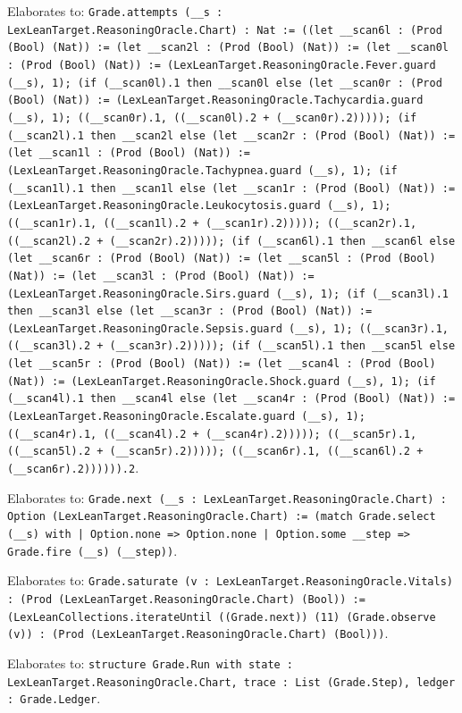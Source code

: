 \documentclass[11pt]{article}
\begin{document}
\noindent Elaborates to: \texttt{Grade.attempts (\_\_s : LexLeanTarget.ReasoningOracle.Chart) : Nat := ((let \_\_scan6l : (Prod (Bool) (Nat)) := (let \_\_scan2l : (Prod (Bool) (Nat)) := (let \_\_scan0l : (Prod (Bool) (Nat)) := (LexLeanTarget.ReasoningOracle.Fever.guard (\_\_s), 1); (if (\_\_scan0l).1 then \_\_scan0l else (let \_\_scan0r : (Prod (Bool) (Nat)) := (LexLeanTarget.ReasoningOracle.Tachycardia.guard (\_\_s), 1); ((\_\_scan0r).1, ((\_\_scan0l).2 + (\_\_scan0r).2))))); (if (\_\_scan2l).1 then \_\_scan2l else (let \_\_scan2r : (Prod (Bool) (Nat)) := (let \_\_scan1l : (Prod (Bool) (Nat)) := (LexLeanTarget.ReasoningOracle.Tachypnea.guard (\_\_s), 1); (if (\_\_scan1l).1 then \_\_scan1l else (let \_\_scan1r : (Prod (Bool) (Nat)) := (LexLeanTarget.ReasoningOracle.Leukocytosis.guard (\_\_s), 1); ((\_\_scan1r).1, ((\_\_scan1l).2 + (\_\_scan1r).2))))); ((\_\_scan2r).1, ((\_\_scan2l).2 + (\_\_scan2r).2))))); (if (\_\_scan6l).1 then \_\_scan6l else (let \_\_scan6r : (Prod (Bool) (Nat)) := (let \_\_scan5l : (Prod (Bool) (Nat)) := (let \_\_scan3l : (Prod (Bool) (Nat)) := (LexLeanTarget.ReasoningOracle.Sirs.guard (\_\_s), 1); (if (\_\_scan3l).1 then \_\_scan3l else (let \_\_scan3r : (Prod (Bool) (Nat)) := (LexLeanTarget.ReasoningOracle.Sepsis.guard (\_\_s), 1); ((\_\_scan3r).1, ((\_\_scan3l).2 + (\_\_scan3r).2))))); (if (\_\_scan5l).1 then \_\_scan5l else (let \_\_scan5r : (Prod (Bool) (Nat)) := (let \_\_scan4l : (Prod (Bool) (Nat)) := (LexLeanTarget.ReasoningOracle.Shock.guard (\_\_s), 1); (if (\_\_scan4l).1 then \_\_scan4l else (let \_\_scan4r : (Prod (Bool) (Nat)) := (LexLeanTarget.ReasoningOracle.Escalate.guard (\_\_s), 1); ((\_\_scan4r).1, ((\_\_scan4l).2 + (\_\_scan4r).2))))); ((\_\_scan5r).1, ((\_\_scan5l).2 + (\_\_scan5r).2))))); ((\_\_scan6r).1, ((\_\_scan6l).2 + (\_\_scan6r).2)))))).2}.\par
\noindent Elaborates to: \texttt{Grade.next (\_\_s : LexLeanTarget.ReasoningOracle.Chart) : Option (LexLeanTarget.ReasoningOracle.Chart) := (match Grade.select (\_\_s) with | Option.none => Option.none | Option.some \_\_step => Grade.fire (\_\_s) (\_\_step))}.\par
\noindent Elaborates to: \texttt{Grade.saturate (v : LexLeanTarget.ReasoningOracle.Vitals) : (Prod (LexLeanTarget.ReasoningOracle.Chart) (Bool)) := (LexLeanCollections.iterateUntil ((Grade.next)) (11) (Grade.observe (v)) : (Prod (LexLeanTarget.ReasoningOracle.Chart) (Bool)))}.\par
\noindent Elaborates to: \texttt{structure Grade.Run with state : LexLeanTarget.ReasoningOracle.Chart, trace : List (Grade.Step), ledger : Grade.Ledger}.\par
\end{document}

